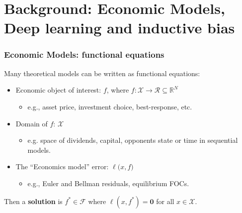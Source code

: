 \documentclass[aspectratio=169,10pt]{beamer}
\newcommand{\emphcolor}[1]{\textbf{\textcolor{emphcolorval}{#1}}}
\newcommand{\Xdom}{\mathcal{X}}
\newcommand{\F}{\mathcal{F}}
\begin{document}
	
\section{\textcolor{PennBlue}{Background: Economic Models, Deep learning and inductive bias}}


\begin{frame}
	\frametitle{Economic Models: functional equations}
	Many theoretical models can be written as functional equations:
	\begin{itemize}
		\item Economic object of interest: $f $, where $f : \Xdom\to \mathcal{R}\subseteq \mathbb{R}^N$ 
		\begin{itemize}
			\item e.g., asset price, investment choice, best-response, etc.
		\end{itemize}
			\vspace{0.1in}
		\item Domain of $f$: $\Xdom$  
		\begin{itemize}
			\item e.g. space of dividends, capital, opponents state or time in sequential models.
		\end{itemize}
			\vspace{0.1in}
		\item The ``Economics model'' error:  $\ell \big(x,f\big)$  
		\begin{itemize}
			\item e.g., Euler and Bellman residuals, equilibrium FOCs.
		\end{itemize}
		\vspace{0.1in}
	\end{itemize}
	Then a \emphcolor{solution} is $f^*\in \F$ where $\ell(x,f^*) = \mathbf{0}$ for all $x \in \Xdom$.\vspace{0.1in}
\end{frame}
\end{document}
